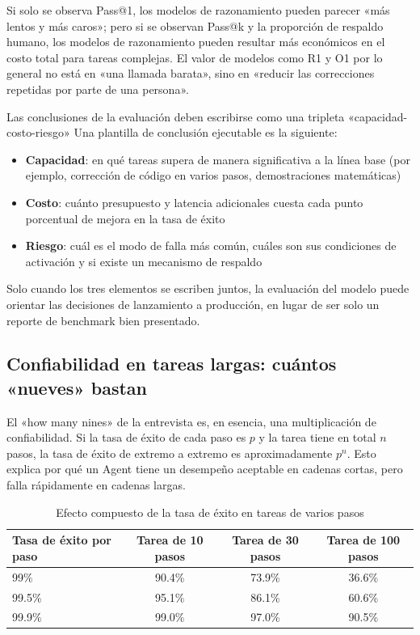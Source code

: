 Si solo se observa Pass@1, los modelos de razonamiento pueden parecer «más lentos y más caros»; pero si se observan Pass@k y la proporción de respaldo humano, los modelos de razonamiento pueden resultar más económicos en el costo total para tareas complejas. El valor de modelos como R1 y O1 por lo general no está en «una llamada barata», sino en «reducir las correcciones repetidas por parte de una persona».

\begin{importantbox}{Las conclusiones de la evaluación deben escribirse como una tripleta «capacidad-costo-riesgo»}
Una plantilla de conclusión ejecutable es la siguiente:
\begin{itemize}
    \item \textbf{Capacidad}: en qué tareas supera de manera significativa a la línea base (por ejemplo, corrección de código en varios pasos, demostraciones matemáticas)
    \item \textbf{Costo}: cuánto presupuesto y latencia adicionales cuesta cada punto porcentual de mejora en la tasa de éxito
    \item \textbf{Riesgo}: cuál es el modo de falla más común, cuáles son sus condiciones de activación y si existe un mecanismo de respaldo
\end{itemize}

Solo cuando los tres elementos se escriben juntos, la evaluación del modelo puede orientar las decisiones de lanzamiento a producción, en lugar de ser solo un reporte de benchmark bien presentado.
\end{importantbox}

\subsection{Confiabilidad en tareas largas: cuántos «nueves» bastan}

El «how many nines» de la entrevista es, en esencia, una multiplicación de confiabilidad. Si la tasa de éxito de cada paso es $p$ y la tarea tiene en total $n$ pasos, la tasa de éxito de extremo a extremo es aproximadamente $p^n$. Esto explica por qué un Agent tiene un desempeño aceptable en cadenas cortas, pero falla rápidamente en cadenas largas.

\begin{table}[H]
\centering
\begin{tabular}{lccc}
\toprule
\textbf{Tasa de éxito por paso} & \textbf{Tarea de 10 pasos} & \textbf{Tarea de 30 pasos} & \textbf{Tarea de 100 pasos} \\
\midrule
99\% & 90.4\% & 73.9\% & 36.6\% \\
99.5\% & 95.1\% & 86.1\% & 60.6\% \\
99.9\% & 99.0\% & 97.0\% & 90.5\% \\
\bottomrule
\end{tabular}
\caption{Efecto compuesto de la tasa de éxito en tareas de varios pasos}
\end{table}

